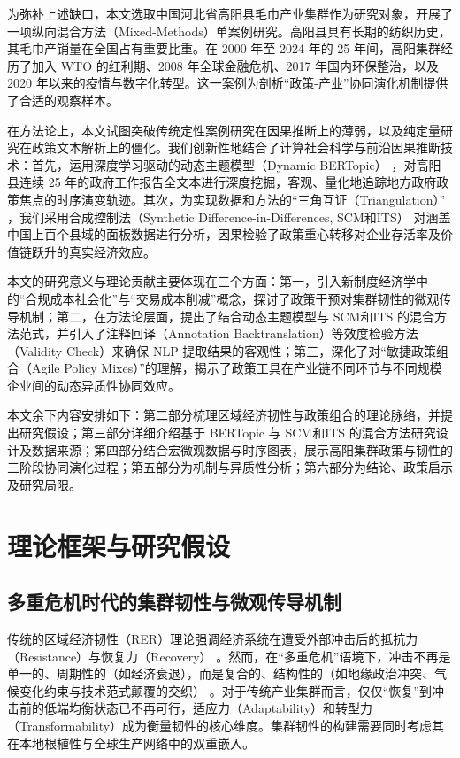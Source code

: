 \documentclass[12pt,a4paper]{ctexart}
\begin{document}
为弥补上述缺口，本文选取中国河北省高阳县毛巾产业集群作为研究对象，开展了一项纵向混合方法（Mixed-Methods）单案例研究。高阳县具有长期的纺织历史，其毛巾产销量在全国占有重要比重。在 2000 年至 2024 年的 25 年间，高阳集群经历了加入 WTO 的红利期、2008 年全球金融危机、2017 年国内环保整治，以及 2020 年以来的疫情与数字化转型。这一案例为剖析“政策-产业”协同演化机制提供了合适的观察样本。

在方法论上，本文试图突破传统定性案例研究在因果推断上的薄弱，以及纯定量研究在政策文本解析上的僵化。我们创新性地结合了计算社会科学与前沿因果推断技术：首先，运用深度学习驱动的动态主题模型（Dynamic BERTopic） \cite{Grootendorst2022}，对高阳县连续 25 年的政府工作报告全文本进行深度挖掘，客观、量化地追踪地方政府政策焦点的时序演变轨迹。其次，为实现数据和方法的“三角互证（Triangulation）” \cite{Creswell2017}，我们采用合成控制法（Synthetic Difference-in-Differences, SCM和ITS） \cite{Arkhangelsky2021} 对涵盖中国上百个县域的面板数据进行分析，因果检验了政策重心转移对企业存活率及价值链跃升的真实经济效应。

本文的研究意义与理论贡献主要体现在三个方面：第一，引入新制度经济学中的“合规成本社会化”与“交易成本削减”概念，探讨了政策干预对集群韧性的微观传导机制；第二，在方法论层面，提出了结合动态主题模型与 SCM和ITS 的混合方法范式，并引入了注释回译（Annotation Backtranslation）等效度检验方法（Validity Check）来确保 NLP 提取结果的客观性；第三，深化了对“敏捷政策组合（Agile Policy Mixes）”的理解，揭示了政策工具在产业链不同环节与不同规模企业间的动态异质性协同效应。

本文余下内容安排如下：第二部分梳理区域经济韧性与政策组合的理论脉络，并提出研究假设；第三部分详细介绍基于 BERTopic 与 SCM和ITS 的混合方法研究设计及数据来源；第四部分结合宏微观数据与时序图表，展示高阳集群政策与韧性的三阶段协同演化过程；第五部分为机制与异质性分析；第六部分为结论、政策启示及研究局限。

\section{理论框架与研究假设}
\label{sec:theory}

\subsection{多重危机时代的集群韧性与微观传导机制}
传统的区域经济韧性（RER）理论强调经济系统在遭受外部冲击后的抵抗力（Resistance）与恢复力（Recovery） \cite{Martin2015}。然而，在“多重危机”语境下，冲击不再是单一的、周期性的（如经济衰退），而是复合的、结构性的（如地缘政治冲突、气候变化约束与技术范式颠覆的交织） \cite{Henry2021}。对于传统产业集群而言，仅仅“恢复”到冲击前的低端均衡状态已不再可行，适应力（Adaptability）和转型力（Transformability）成为衡量韧性的核心维度。集群韧性的构建需要同时考虑其在本地根植性与全球生产网络中的双重嵌入。
\end{document}
